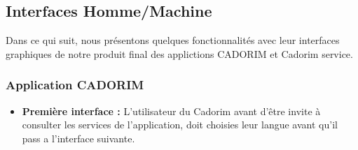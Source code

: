 \subsection{Interfaces Homme/Machine}
Dans ce qui suit, nous présentons quelques  fonctionnalités avec leur interfaces \newline graphiques de notre produit final des applictions CADORIM et Cadorim service.
\subsubsection{Application CADORIM}
\begin{itemize}[label=$\ast$]
		\item \textbf{Première interface :} L'utilisateur du Cadorim avant d'être invite à consulter les services de l'application, doit 
			choisies leur langue avant qu'il pass a l'interface suivante.
			

\end{itemize}
